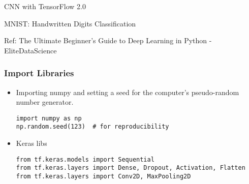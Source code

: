 \begin{frame}
  \begin{center}
    {\Large CNN with TensorFlow 2.0}
    
  \end{center}
\end{frame}

\begin{frame}
  \begin{center}
    {\Large MNIST: Handwritten Digits Classification}
    
    {\tiny Ref: The Ultimate Beginner's Guide to Deep Learning in Python - EliteDataScience}
  \end{center}
\end{frame}


\begin{frame}[fragile] \frametitle{Import Libraries}

\begin{itemize}
\item Importing numpy and setting a seed for the computer's pseudo-random number generator.
\begin{lstlisting}
import numpy as np
np.random.seed(123)  # for reproducibility
\end{lstlisting}
\item Keras libs
\begin{lstlisting}
from tf.keras.models import Sequential
from tf.keras.layers import Dense, Dropout, Activation, Flatten
from tf.keras.layers import Conv2D, MaxPooling2D
\end{lstlisting}
\end{itemize}
\end{frame}

